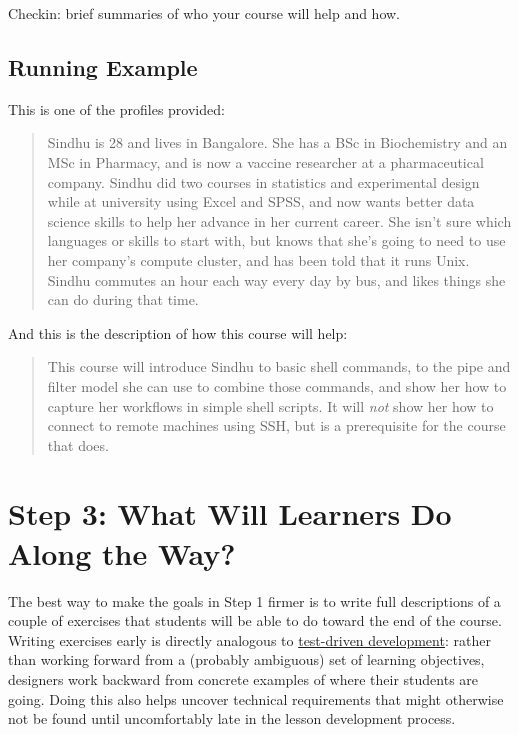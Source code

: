 \documentclass[10pt,statementpaper]{memoir}
\begin{document}
Checkin: brief summaries of who your course will help and how.

\subsection{Running Example}\label{running-example-1}

This is one of the profiles provided:

\begin{quote}
Sindhu is 28 and lives in Bangalore. She has a BSc in Biochemistry and
an MSc in Pharmacy, and is now a vaccine researcher at a pharmaceutical
company. Sindhu did two courses in statistics and experimental design
while at university using Excel and SPSS, and now wants better data
science skills to help her advance in her current career. She isn't sure
which languages or skills to start with, but knows that she's going to
need to use her company's compute cluster, and has been told that it
runs Unix. Sindhu commutes an hour each way every day by bus, and likes
things she can do during that time.
\end{quote}

And this is the description of how this course will help:

\begin{quote}
This course will introduce Sindhu to basic shell commands, to the pipe
and filter model she can use to combine those commands, and show her how
to capture her workflows in simple shell scripts. It will \emph{not}
show her how to connect to remote machines using SSH, but is a
prerequisite for the course that does.
\end{quote}

\section{Step 3: What Will Learners Do Along the
Way?}\label{step-3-what-will-learners-do-along-the-way}

The best way to make the goals in Step 1 firmer is to write full
descriptions of a couple of exercises that students will be able to do
toward the end of the course. Writing exercises early is directly
analogous to
\href{https://en.wikipedia.org/wiki/Test-driven_development}{test-driven
development}: rather than working forward from a (probably ambiguous)
set of learning objectives, designers work backward from concrete
examples of where their students are going. Doing this also helps
uncover technical requirements that might otherwise not be found until
uncomfortably late in the lesson development process.
\end{document}
